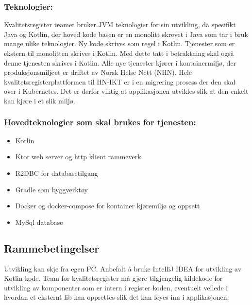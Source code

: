 \subsubsection*{Teknologier:}

Kvalitetsregister teamet bruker JVM teknologier for sin utvikling, da spesifikt Java og Kotlin, der hoved kode basen er en monolitt skrevet i Java som tar i bruk mange ulike teknologier. Ny kode skrives som regel i Kotlin. Tjenester som er ekstern til monolitten skrives i Kotlin. Med dette tatt i betraktning skal også denne tjenesten skrives i Kotlin. Alle nye tjenester kjører i kontainermiljø, der produksjonsmiljøet er driftet av Norsk Helse Nett (NHN).
Hele kvalitetsregisterplattformen til HN-IKT er i en migrering prosess der den skal over i Kubernetes. Det er derfor viktig at applikasjonen utvikles slik at den enkelt kan kjøre i et slik miljø.

\newpage
\subsubsection*{Hovedteknologier som skal brukes for tjenesten:}
\begin{itemize}
    \item Kotlin
    \item Ktor web server og http klient rammeverk
    \item R2DBC for databasetilgang
    \item Gradle som byggverktøy
    \item Docker og docker-compose for kontainer kjøremiljø og oppsett
    \item MySql database     
\end{itemize}

\subsection{Rammebetingelser}
 
Utvikling kan skje fra egen PC. Anbefalt å bruke IntelliJ IDEA for utvikling av Kotlin kode. Team for kvalitetsregister må gjøre tilgjengelig kildekode for utvikling av komponenter som er intern i register koden, eventuelt veilede i hvordan et eksternt lib kan opprettes slik det kan føyes inn i applikasjonen.